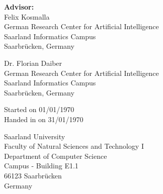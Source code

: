 \pagestyle{empty}

\vspace*{0.5cm}
\textbf{Advisor:}\\
Felix Kosmalla\\
German Research Center for Artificial Intelligence\\
Saarland Informatics Campus\\
Saarbrücken, Germany

\vspace*{0.5cm}
Dr. Florian Daiber\\
German Research Center for Artificial Intelligence\\
Saarland Informatics Campus\\
Saarbrücken, Germany


\vspace{3.5cm}
Started on 01/01/1970\\
Handed in on 31/01/1970


\vspace{3.5cm}


\vspace{3cm}
Saarland University\\
Faculty of Natural Sciences and Technology I\\
Department of Computer Science\\
Campus - Building E1.1\\
66123 Saarbrücken\\
Germany\\


